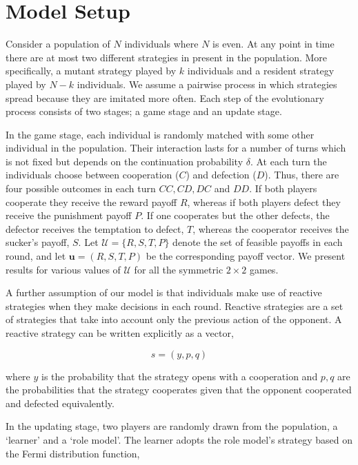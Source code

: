 \documentclass[11pt]{article}
\theoremstyle{plainCl1}
\theoremstyle{plainCl2}
\begin{document}
\appendix

\section{Model Setup}\label{appendix:methods}

Consider a population of \(N\) individuals where \(N\) is even. At any point in
time there are at most two different strategies in present in the population.
More specifically, a mutant strategy played by \(k\) individuals and a resident
strategy played by \(N - k\) individuals. We assume a pairwise process in which
strategies spread because they are imitated more often. Each step of the
evolutionary process consists of two stages; a game stage and an update stage.

In the game stage, each individual is randomly matched with some other
individual in the population. Their interaction lasts for a number of turns
which is not fixed but depends on the continuation probability \(\delta\). At
each turn the individuals choose between cooperation (\(C\)) and defection
(\(D\)). Thus, there are four possible outcomes in each turn \(CC, CD, DC\) and
\(DD\). If both players cooperate they receive the reward payoff \(R\), whereas
if both players defect they receive the punishment payoff \(P\). If one
cooperates but the other defects, the defector receives the temptation to
defect, \(T\), whereas the cooperator receives the sucker's payoff, \(S\).
Let $\mathcal{U}=\{R,S,T,P\}$ denote the set of feasible payoffs in each round,
and let $\mathbf{u}\!=\!(R,S,T,P)$ be the corresponding payoff vector.
We present results for various values of $\mathcal{U}$ for all
the symmetric \(2 \times 2\) games.

A further assumption of our model is that individuals make use of reactive
strategies when they make decisions in each round. Reactive strategies are a set
of strategies that take into account only the previous action of the opponent.
A reactive strategy can be written explicitly as a vector,

\[s=(y, p, q)\]

where \(y\) is the probability that the strategy opens with a cooperation and
\(p, q\) are the probabilities that the strategy cooperates given that the
opponent cooperated and defected equivalently.

In the updating stage, two players are randomly drawn from the population, a
`learner' and a `role model'. The learner adopts the role model's strategy
based on the Fermi distribution function, %
\end{document}
